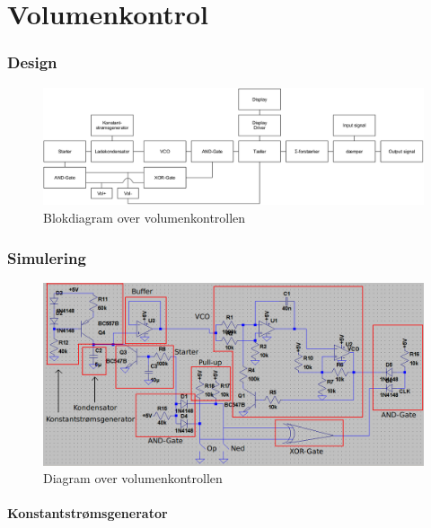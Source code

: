 \chapter{Volumenkontrol}
\label{volumenkontrol}

\subsection{Design}
\label{volumenkontrol-design}

\begin{figure}[h]
\centering
\includegraphics[width=\textwidth]{implementering/volumenkontrol/blokdiagram.png}
\caption{Blokdiagram over volumenkontrollen}
\label{fig:volumenkontrol_opbygning}
\end{figure}

\subsection{Simulering}
\label{volumenkontrol-simulering}

\begin{figure}[h]
\centering
\includegraphics[width=\textwidth]{implementering/volumenkontrol/diagram.png}
\caption{Diagram over volumenkontrollen}
\label{fig:volumenkontrol_diagram}
\end{figure}

\subsubsection{Konstantstrømsgenerator}
\label{volumenkontrol-simulering-konstantstroemsgenerator}

